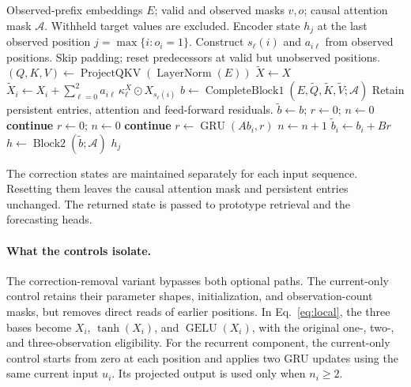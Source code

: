 \documentclass[runningheads]{llncs}
\newcommand{\GELU}{\operatorname{GELU}}
\begin{document}
\begin{algorithm}[H]
\caption{Causal local and recurrent history correction}
\label{alg:history-correction}
\small
\begin{algorithmic}[1]
\Require Observed-prefix embeddings $E$; valid and observed masks $v,o$;
\Statex \hspace{\algorithmicindent} causal attention mask $\mathcal A$. Withheld target values are excluded.
\Ensure Encoder state $h_j$ at the last observed position $j=\max\{i:o_i=1\}$.
\State Construct $s_\ell(i)$ and $a_{i\ell}$ from observed positions.
\Statex \hspace{\algorithmicindent} Skip padding; reset predecessors at valid but unobserved positions.
\State $(Q,K,V)\gets\operatorname{ProjectQKV}(\operatorname{LayerNorm}(E))$
    \State $\widetilde X\gets X$
        \State $\widetilde X_i\gets X_i+\sum_{\ell=0}^{2}a_{i\ell}\,\kappa^X_\ell\odot X_{s_\ell(i)}$
    \EndFor
\EndFor
\State $b\gets\operatorname{CompleteBlock1}(E,\widetilde Q,\widetilde K,\widetilde V;\mathcal A)$
\Statex \hspace{\algorithmicindent} Retain persistent entries, attention and feed-forward residuals.
\State $\widetilde b\gets b$; $r\gets0$; $n\gets0$
     \State \textbf{continue} \EndIf
        \State $r\gets0$; $n\gets0$
        \State \textbf{continue}
    \EndIf
    \State $r\gets\operatorname{GRU}(A b_i,r)$
    \State $n\gets n+1$
        \State $\widetilde b_i\gets b_i+B r$
    \EndIf
\EndFor
\State $h\gets\operatorname{Block2}(\widetilde b;\mathcal A)$
\State \Return $h_j$
\end{algorithmic}
\end{algorithm}

The correction states are maintained separately for each input sequence. Resetting them leaves the causal attention mask and persistent entries unchanged. The returned state is passed to prototype retrieval and the forecasting heads.

\paragraph{What the controls isolate.}
The correction-removal variant bypasses both optional paths. The current-only control retains their parameter shapes, initialization, and observation-count masks, but removes direct reads of earlier positions. In Eq.~\eqref{eq:local}, the three bases become $X_i$, $\tanh(X_i)$, and $\GELU(X_i)$, with the original one-, two-, and three-observation eligibility. For the recurrent component, the current-only control starts from zero at each position and applies two GRU updates using the same current input $u_i$. Its projected output is used only when $n_i\geq2$.
\end{document}
